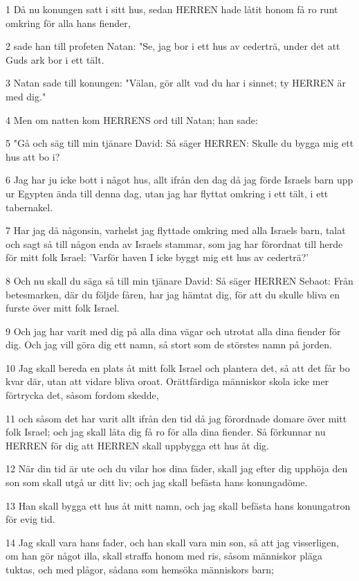 \par 1 Då nu konungen satt i sitt hus, sedan HERREN hade låtit honom få ro runt omkring för alla hans fiender,
\par 2 sade han till profeten Natan: "Se, jag bor i ett hus av cederträ, under det att Guds ark bor i ett tält.
\par 3 Natan sade till konungen: "Välan, gör allt vad du har i sinnet; ty HERREN är med dig."
\par 4 Men om natten kom HERRENS ord till Natan; han sade:
\par 5 "Gå och säg till min tjänare David: Så säger HERREN: Skulle du bygga mig ett hus att bo i?
\par 6 Jag har ju icke bott i något hus, allt ifrån den dag då jag förde Israels barn upp ur Egypten ända till denna dag, utan jag har flyttat omkring i ett tält, i ett tabernakel.
\par 7 Har jag då någonsin, varhelst jag flyttade omkring med alla Israels barn, talat och sagt så till någon enda av Israels stammar, som jag har förordnat till herde för mitt folk Israel: 'Varför haven I icke byggt mig ett hus av cederträ?'
\par 8 Och nu skall du säga så till min tjänare David: Så säger HERREN Sebaot: Från betesmarken, där du följde fåren, har jag hämtat dig, för att du skulle bliva en furste över mitt folk Israel.
\par 9 Och jag har varit med dig på alla dina vägar och utrotat alla dina fiender för dig. Och jag vill göra dig ett namn, så stort som de störstes namn på jorden.
\par 10 Jag skall bereda en plats åt mitt folk Israel och plantera det, så att det får bo kvar där, utan att vidare bliva oroat. Orättfärdiga människor skola icke mer förtrycka det, såsom fordom skedde,
\par 11 och såsom det har varit allt ifrån den tid då jag förordnade domare över mitt folk Israel; och jag skall låta dig få ro för alla dina fiender. Så förkunnar nu HERREN för dig att HERREN skall uppbygga ett hus åt dig.
\par 12 När din tid är ute och du vilar hos dina fäder, skall jag efter dig upphöja den son som skall utgå ur ditt liv; och jag skall befästa hans konungadöme.
\par 13 Han skall bygga ett hus åt mitt namn, och jag skall befästa hans konungatron för evig tid.
\par 14 Jag skall vara hans fader, och han skall vara min son, så att jag visserligen, om han gör något illa, skall straffa honom med ris, såsom människor pläga tuktas, och med plågor, sådana som hemsöka människors barn;
